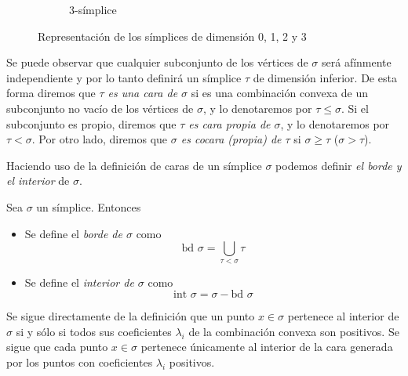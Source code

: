 \begin{figure}[h]
\begin{subfigure}[b]{0.2\textwidth}
	\caption{3-símplice}\label{ref:3simp}
\end{subfigure}
\caption{Representación de los símplices de dimensión 0, 1, 2 y 3}
\end{figure}

Se puede observar que cualquier subconjunto de los vértices de $\sigma$ será afínmente independiente y por lo tanto definirá un símplice $\tau$ de dimensión inferior. De esta forma diremos que \emph{$\tau$ es una cara de $\sigma$} si es una combinación convexa de un subconjunto no vacío de los vértices de $\sigma$, y lo denotaremos por $\tau \leq \sigma$. Si el subconjunto es propio, diremos que \emph{$\tau$ es cara propia de $\sigma$}, y lo denotaremos por $\tau < \sigma$. Por otro lado, diremos que \emph{$\sigma$ es cocara (propia) de $\tau$}  si $\sigma \geq \tau$ ($\sigma > \tau$).

Haciendo uso de la definición de caras de un símplice $\sigma$ podemos definir \emph{el borde y el interior} de $\sigma$.

\begin{definition}
Sea $\sigma$ un símplice. Entonces
\begin{itemize}
	\item Se define el \emph{borde de $\sigma$} como \[\text{bd } \sigma = \bigcup_{\tau<\sigma}\tau\]
	\item Se define el \emph{interior de $\sigma$} como \[\text{int }\sigma= \sigma - \text{bd }\sigma\]
\end{itemize}
\end{definition}

\begin{remark}
Se sigue directamente de la definición que un punto $x \in \sigma$ pertenece al interior de $\sigma$ si y sólo si todos sus coeficientes $\lambda_i$ de la combinación convexa son positivos. Se sigue que cada punto $x \in \sigma$ pertenece únicamente al interior de la cara generada por los puntos con coeficientes $\lambda_i$ positivos.
\end{remark}

